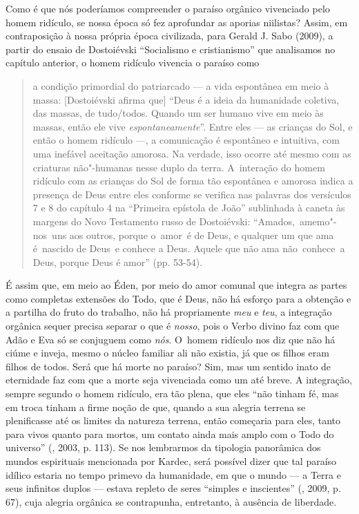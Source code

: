 Como é que nós poderíamos compreender o paraíso orgânico vivenciado pelo
homem ridículo, se nossa época só fez aprofundar as aporias niilistas?
Assim, em contraposição à nossa própria época civilizada, para Gerald J.
Sabo (2009), a partir do ensaio de Dostoiévski ``Socialismo e
cristianismo'' que analisamos no capítulo anterior, o homem ridículo
vivencia o paraíso como

\begin{quote}
a condição primordial do patriarcado --- a vida espontânea em meio à
massa: {[}Dostoiévski afirma que{]} ``Deus é a ideia da humanidade
coletiva, das massas, de tudo/todos. Quando um ser humano vive em meio
às massas, então ele vive \emph{espontaneamente}''. Entre eles --- as
crianças do Sol, e então o homem ridículo ---, a comunicação é espontâneo
e intuitiva, com uma inefável aceitação amorosa. Na verdade, isso ocorre
até mesmo com as criaturas não"-humanas nesse duplo da terra. A~interação
do homem ridículo com as crianças do Sol de forma tão espontânea e
amorosa indica a presença de Deus entre eles conforme se verifica nas
palavras dos versículos 7 e 8 do capítulo 4 na ``Primeira epístola de
João'' sublinhada à caneta às margens do Novo Testamento russo de
Dostoiévski: ``Amados,~amemo"-nos~uns aos outros, porque o~amor~é de
Deus, e qualquer um que ama é~nascido de Deus~e conhece a Deus. Aquele
que não ama não~conhece~a Deus, porque Deus é amor'' (pp. 53-54).
\end{quote}

É assim que, em meio ao Éden, por meio do amor comunal que integra as
partes como completas extensões do Todo, que é Deus, não há esforço para
a obtenção e a partilha do fruto do trabalho, não há propriamente
\emph{meu} e \emph{teu}, a integração orgânica sequer precisa separar o
que é \emph{nosso}, pois o Verbo divino faz com que Adão e Eva só se
conjuguem como \emph{nós}. O~homem ridículo nos diz que não há ciúme e
inveja, mesmo o núcleo familiar ali não existia, já que os filhos eram
filhos de todos. Será que há morte no paraíso? Sim, mas um sentido inato
de eternidade faz com que a morte seja vivenciada como um até breve. A
integração, sempre segundo o homem ridículo, era tão plena, que eles
``não tinham fé, mas em troca tinham a firme noção de que, quando a sua
alegria terrena se plenificasse até os limites da natureza terrena,
então começaria para eles, tanto para vivos quanto para mortos, um
contato ainda mais amplo com o Todo do universo'' (, 2003, p.
113). Se nos lembrarmos da tipologia panorâmica dos mundos espirituais
mencionada por Kardec, será possível dizer que tal paraíso idílico
estaria no tempo primevo da humanidade, em que o mundo --- a Terra e seus
infinitos duplos --- estava repleto de seres ``simples e inscientes''
(, 2009, p. 67), cuja alegria orgânica se contrapunha, entretanto,
à ausência de liberdade.

